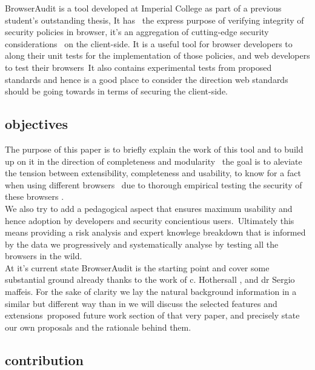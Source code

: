 \documentclass[a4paper,12pt]{report}
\begin{document}
BrowserAudit is a tool developed at Imperial College as part of a previous student's outstanding thesis, It has \
the express purpose of verifying integrity of security policies in browser, it's an aggregation of cutting-edge security considerations \ 
on the client-side. 
It is a useful tool for browser developers to along their unit tests for the implementation of those policies, and web developers to test their browsers\
It also contains experimental tests from proposed standards and hence is a good place to consider the direction web standards should be going towards in terms of securing the client-side.\


\subsection{objectives}

The purpose of this paper is to briefly explain the work of this tool and to build up on it in the direction of completeness and modularity \
the goal is to aleviate the tension between extensibility, completeness and usability, to know for a fact when using different browsers \
due to thorough  empirical testing the security of these browsers .\\


We also try to add a pedagogical aspect that ensures maximum usability and hence adoption by developers and security concientious users.\ 
Ultimately this means providing a risk analysis and expert knowlege breakdown that is informed by the data we progressively and systematically analyse by testing all the browsers in the wild.\\

At it's current state BrowserAudit is the starting point and cover some substantial ground already thanks to the work of c. Hothersall , and dr Sergio maffeis.
For the sake of clarity we lay the natural background information in a similar but different way than in \cite{maffeis}  we will discuss the selected features and extensions\
proposed future work section of that very paper, and precisely state our own proposals and the rationale behind them.\\

\subsection{contribution}
\end{document}
